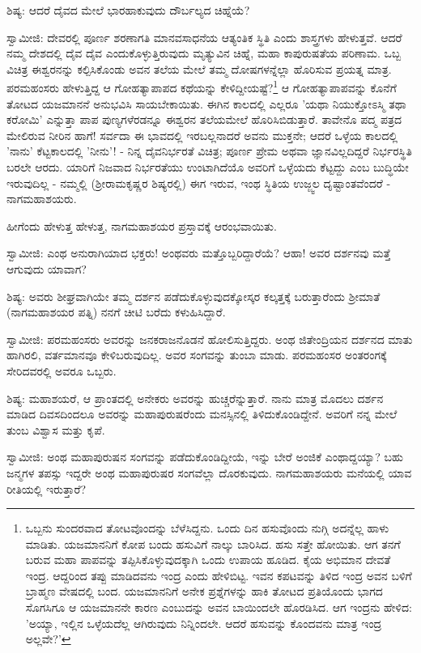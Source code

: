 ಶಿಷ್ಯ: ಆದರೆ ದೈವದ ಮೇಲೆ ಭಾರಹಾಕುವುದು ದೌರ್ಬಲ್ಯದ ಚಿಹ್ನೆಯೆ?

ಸ್ವಾಮೀಜಿ: ದೇವರಲ್ಲಿ ಪೂರ್ಣ ಶರಣಾಗತಿ ಮಾನವಸಾಧನೆಯ ಆತ್ಯಂತಿಕ ಸ್ಥಿತಿ ಎಂದು ಶಾಸ್ತ್ರಗಳು ಹೇಳುತ್ತವೆ. ಆದರೆ ನಮ್ಮ ದೇಶದಲ್ಲಿ ದೈವ ದೈವ ಎಂದುಕೊಳ್ಳುತ್ತಿರುವುದು ಮೃತ್ಯುವಿನ ಚಿಹ್ನೆ, ಮಹಾ ಕಾಪುರುಷತೆಯ ಪರಿಣಾಮ. ಒಬ್ಬ ವಿಚಿತ್ರ ಈಶ್ವರನನ್ನು ಕಲ್ಪಿಸಿಕೊಂಡು ಅವನ ತಲೆಯ ಮೇಲೆ ತಮ್ಮ ದೋಷಗಳನ್ನೆಲ್ಲಾ ಹೊರಿಸುವ ಪ್ರಯತ್ನ ಮಾತ್ರ. ಪರಮಹಂಸರು ಹೇಳುತ್ತಿದ್ದ ಆ ಗೋಹತ್ಯಾಪಾಪದ ಕಥೆಯನ್ನು ಕೇಳಿದ್ದೀಯಷ್ಟೆ?\footnote{ಒಬ್ಬನು ಸುಂದರವಾದ ತೋಟವೊಂದನ್ನು ಬೆಳೆಸಿದ್ದನು. ಒಂದು ದಿನ ಹಸುವೊಂದು ನುಗ್ಗಿ ಅದನ್ನೆಲ್ಲ ಹಾಳು ಮಾಡಿತು. ಯಜಮಾನನಿಗೆ ಕೋಪ ಬಂದು ಹಸುವಿಗೆ ನಾಲ್ಕು ಬಾರಿಸಿದ. ಹಸು ಸತ್ತೇ ಹೋಯಿತು. ಆಗ ತನಗೆ ಬರುವ ಮಹಾ ಪಾಪವನ್ನು ತಪ್ಪಿಸಿಕೊಳ್ಳುವುದಕ್ಕಾಗಿ ಒಂದು ಉಪಾಯ ಹೂಡಿದ. ಕೈಯ ಅಭಿಮಾನ ದೇವತೆ ಇಂದ್ರ. ಆದ್ದರಿಂದ ತಪ್ಪು ಮಾಡಿದವನು ಇಂದ್ರ ಎಂದು ಹೇಳಿಬಿಟ್ಟ. ಇವನ ಕಪಟವನ್ನು ತಿಳಿದ ಇಂದ್ರ ಅವನ ಬಳಿಗೆ ಬ್ರಾಹ್ಮಣ ವೇಷದಲ್ಲಿ ಬಂದ. ಯಜಮಾನನಿಗೆ ಅನೇಕ ಪ್ರಶ್ನೆಗಳನ್ನು ಹಾಕಿ ತೋಟದ ಪ್ರತಿಯೊಂದು ಭಾಗದ ಸೊಗಸಿಗೂ ಆ ಯಜಮಾನನೇ ಕಾರಣ ಎಂಬುದನ್ನು ಅವನ ಬಾಯಿಂದಲೇ ಹೊರಡಿಸಿದ. ಆಗ ಇಂದ್ರನು ಹೇಳಿದ: 'ಅಯ್ಯಾ, ಇಲ್ಲಿನ ಒಳ್ಳೆಯದೆಲ್ಲ ಆಗಿರುವುದು ನಿನ್ನಿಂದಲೇ. ಆದರೆ ಹಸುವನ್ನು ಕೊಂದವನು ಮಾತ್ರ ಇಂದ್ರ ಅಲ್ಲವೇ?'} ಆ ಗೋಹತ್ಯಾಪಾಪವನ್ನು ಕೊನೆಗೆ ತೋಟದ ಯಜಮಾನನೆ ಅನುಭವಿಸಿ ಸಾಯಬೇಕಾಯಿತು. ಈಗಿನ ಕಾಲದಲ್ಲಿ ಎಲ್ಲರೂ 'ಯಥಾ ನಿಯುಕ್ತೋಽಸ್ಮಿ ತಥಾ ಕರೋಮಿ' ಎನ್ನುತ್ತಾ ಪಾಪ ಪುಣ್ಯಗಳೆರಡನ್ನೂ ಈಶ್ವರನ ತಲೆಯಮೇಲೆ ಹೊರಿಸಿಬಿಡುತ್ತಾರೆ. ತಾವೇನೊ ಪದ್ಮ ಪತ್ರದ ಮೇಲಿರುವ ನೀರಿನ ಹಾಗೆ! ಸರ್ವದಾ ಈ ಭಾವದಲ್ಲಿ ಇರಬಲ್ಲನಾದರೆ ಅವನು ಮುಕ್ತನೇ; ಆದರೆ ಒಳ್ಳೆಯ ಕಾಲದಲ್ಲಿ 'ನಾನು' ಕೆಟ್ಟಕಾಲದಲ್ಲಿ 'ನೀನು'! - ನಿನ್ನ ದೈವನಿರ್ಭರತೆ ವಿಚಿತ್ರ; ಪೂರ್ಣ ಪ್ರೇಮ ಅಥವಾ ಜ್ಞಾನವಿಲ್ಲದಿದ್ದರೆ ನಿರ್ಭರಸ್ಥಿತಿ ಬರಲೇ ಆರದು. ಯಾರಿಗೆ ನಿಜವಾದ ನಿರ್ಭರತೆಯು ಉಂಟಾಗಿದೆಯೊ ಅವರಿಗೆ ಒಳ್ಳೆಯದು ಕೆಟ್ಟದ್ದು ಎಂಬ ಬುದ್ಧಿಯೇ ಇರುವುದಿಲ್ಲ - ನಮ್ಮಲ್ಲಿ (ಶ‍್ರೀರಾಮಕೃಷ್ಣರ ಶಿಷ್ಯರಲ್ಲಿ) ಈಗ ಇರುವ, ಇಂಥ ಸ್ಥಿತಿಯ ಉಜ್ಜ್ವಲ ದೃಷ್ಟಾಂತವೆಂದರೆ - ನಾಗಮಹಾಶಯರು.

ಹೀಗೆಂದು ಹೇಳುತ್ತ ಹೇಳುತ್ತ, ನಾಗಮಹಾಶಯರ ಪ್ರಸ್ತಾವಕ್ಕೆ ಆರಂಭವಾಯಿತು.

ಸ್ವಾಮೀಜಿ: ಎಂಥ ಅನುರಾಗಿಯಾದ ಭಕ್ತರು! ಅಂಥವರು ಮತ್ತೊಬ್ಬರಿದ್ದಾರೆಯೆ? ಆಹಾ! ಅವರ ದರ್ಶನವು ಮತ್ತೆ ಆಗುವುದು ಯಾವಾಗ?

ಶಿಷ್ಯ: ಅವರು ಶೀಘ್ರವಾಗಿಯೇ ತಮ್ಮ ದರ್ಶನ ಪಡೆದುಕೊಳ್ಳುವುದಕ್ಕೋಸ್ಕರ ಕಲ್ಕತ್ತಕ್ಕೆ ಬರುತ್ತಾರೆಂದು ಶ‍್ರೀಮಾತೆ (ನಾಗಮಹಾಶಯರ ಪತ್ನಿ) ನನಗೆ ಚೀಟಿ ಬರೆದು ಕಳುಹಿಸಿದ್ದಾರೆ.

ಸ್ವಾಮೀಜಿ: ಪರಮಹಂಸರು ಅವರನ್ನು ಜನಕರಾಜನೊಡನೆ ಹೋಲಿಸುತ್ತಿದ್ದರು. ಅಂಥ ಜಿತೇಂದ್ರಿಯನ ದರ್ಶನದ ಮಾತು ಹಾಗಿರಲಿ, ವರ್ತಮಾನವೂ ಕೇಳಿಬರುವುದಿಲ್ಲ. ಅವರ ಸಂಗವನ್ನು ತುಂಬಾ ಮಾಡು. ಪರಮಹಂಸರ ಅಂತರಂಗಕ್ಕೆ ಸೇರಿದವರಲ್ಲಿ ಅವರೂ ಒಬ್ಬರು.

ಶಿಷ್ಯ: ಮಹಾಶಯರೆ, ಆ ಪ್ರಾಂತದಲ್ಲಿ ಅನೇಕರು ಅವರನ್ನು ಹುಚ್ಚರೆನ್ನುತ್ತಾರೆ. ನಾನು ಮಾತ್ರ ಮೊದಲು ದರ್ಶನ ಮಾಡಿದ ದಿವಸದಿಂದಲೂ ಅವರನ್ನು ಮಹಾಪುರುಷರೆಂದು ಮನಸ್ಸಿನಲ್ಲಿ ತಿಳಿದುಕೊಂಡಿದ್ದೇನೆ. ಅವರಿಗೆ ನನ್ನ ಮೇಲೆ ತುಂಬ ವಿಶ್ವಾಸ ಮತ್ತು ಕೃಪೆ.

ಸ್ವಾಮೀಜಿ: ಅಂಥ ಮಹಾಪುರುಷನ ಸಂಗವನ್ನು ಪಡೆದುಕೊಂಡಿದ್ದೀಯೆ, ಇನ್ನು ಬೇರೆ ಅಂಜಿಕೆ ಎಂಥಾದ್ದಯ್ಯಾ? ಬಹು ಜನ್ಮಗಳ ತಪಸ್ಸು ಇದ್ದರೇ ಅಂಥ ಮಹಾಪುರುಷರ ಸಂಗವೆಲ್ಲಾ ದೊರಕುವುದು. ನಾಗಮಹಾಶಯರು ಮನೆಯಲ್ಲಿ ಯಾವ ರೀತಿಯಲ್ಲಿ ಇರುತ್ತಾರೆ?

